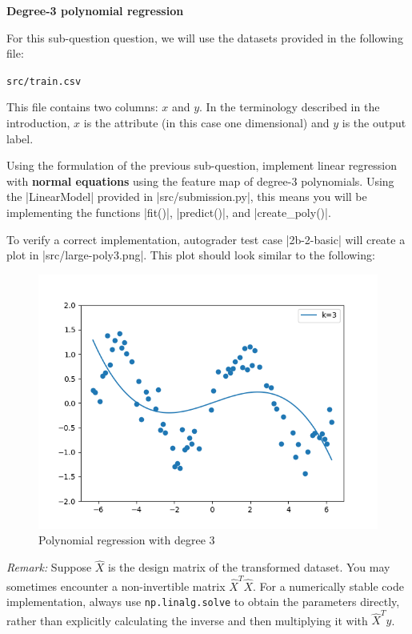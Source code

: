 \item {} {\bf Degree-3 polynomial regression}


For this sub-question question, we will use the datasets provided in
the following file:
%
\begin{center}
	\texttt{src/train.csv}
\end{center}
%

This file contains two columns: $x$ and $y$. In the terminology described in the introduction, $x$ is the attribute (in this case one dimensional) and $y$ is the output label.

Using the formulation of the previous sub-question, implement linear regression with \textbf{normal equations} using the feature map of degree-3 polynomials. Using the |LinearModel| provided in |src/submission.py|, this means you will be implementing the functions |fit()|, |predict()|, and |create_poly()|.  

To verify a correct implementation, autograder test case |2b-2-basic| will create a plot in |src/large-poly3.png|.  This plot should look similar to the following:
\begin{figure}[H]
  \centering
  \includegraphics[width=0.65\linewidth]{02-featuremaps/large-poly3.png}
  \centering
\caption{Polynomial regression with degree 3}
\end{figure}

\emph{Remark: } Suppose $\widehat{X}$ is the design matrix of the transformed dataset. You may sometimes encounter a non-invertible matrix $\widehat{X}^T\widehat{X}$. For a numerically stable code implementation, always use \texttt{np.linalg.solve} to obtain the parameters directly, rather than explicitly calculating the inverse and then multiplying it with $\widehat{X}^Ty$.
